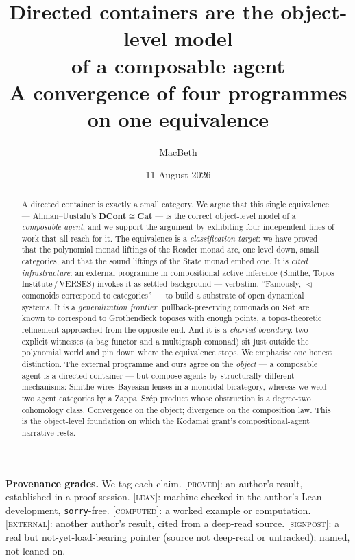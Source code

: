 \documentclass[11pt]{amsart}
\title[Directed containers are the object-level model of a composable agent]{Directed
containers are the object-level model\\ of a composable agent\\[4pt]
\large A convergence of four programmes on one equivalence}
\author{MacBeth}
\date{11 August 2026}
\theoremstyle{plain}
\theoremstyle{definition}
\newcommand{\Set}{\mathbf{Set}}
\newcommand{\Cat}{\mathbf{Cat}}
\newcommand{\DCont}{\mathbf{DCont}}
\newcommand{\seq}{\vartriangleleft}
\newcommand{\iso}{\cong}
\newcommand{\gProved}{\textsc{[proved]}}
\newcommand{\gLean}{\textsc{[lean]}}
\newcommand{\gComputed}{\textsc{[computed]}}
\newcommand{\gExternal}{\textsc{[external]}}
\newcommand{\gSignpost}{\textsc{[signpost]}}
\begin{document}
\begin{abstract}
A directed container is exactly a small category. We argue that this single equivalence ---
Ahman--Uustalu's $\DCont\iso\Cat$ --- is the correct object-level model of a \emph{composable
agent}, and we support the argument by exhibiting four independent lines of work that all reach
for it. The equivalence is a \emph{classification target}: we have proved that the polynomial
monad liftings of the Reader monad are, one level down, small categories, and that the sound
liftings of the State monad embed one. It is
\emph{cited infrastructure}: an external programme in compositional active inference (Smithe,
Topos Institute\,/\,VERSES) invokes it as settled background --- verbatim, ``Famously,
$\seq$-comonoids correspond to categories'' --- to build a substrate of open dynamical systems.
It is a \emph{generalization frontier}: pullback-preserving comonads on $\Set$ are known to
correspond to Grothendieck toposes with enough points, a topos-theoretic refinement approached
from the opposite end. And it is a \emph{charted boundary}: two explicit witnesses (a bag
functor and a multigraph comonad) sit just outside the polynomial world and pin down where the
equivalence stops. We emphasise one honest distinction. The external programme and ours agree on
the \emph{object} --- a composable agent is a directed container --- but compose agents by
structurally different mechanisms: Smithe wires Bayesian lenses in a monoidal bicategory, whereas
we weld two agent categories by a Zappa--Sz\'ep product whose obstruction is a degree-two
cohomology class. Convergence on the object; divergence on the composition law. This is the
object-level foundation on which the Kodamai grant's compositional-agent narrative rests.
\end{abstract}

\maketitle

\begin{mdframed}[linewidth=0.5pt]
\small\textbf{Provenance grades.} We tag each claim.
\gProved: an author's result, established in a proof session.
\gLean: machine-checked in the author's Lean development, \texttt{sorry}-free.
\gComputed: a worked example or computation.
\gExternal: another author's result, cited from a deep-read source.
\gSignpost: a real but not-yet-load-bearing pointer (source not deep-read or untracked); named,
not leaned on.
\end{mdframed}
\end{document}
